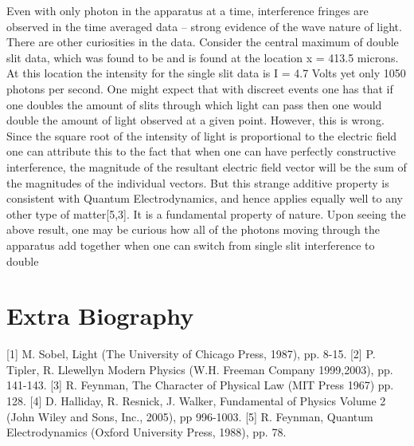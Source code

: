 \documentclass[12pt,twocolumn]{article}
\begin{document}
Even with only photon in the apparatus at a time, interference fringes are  observed in the time averaged data – strong evidence of the wave nature of light. There are other curiosities in the data. Consider the central maximum of double slit data, which was found to be and is found at the location x = 413.5 microns. At this location the intensity for the single slit data is I = 4.7 Volts yet only 1050 photons per second. One might expect that with discreet events one has that if one doubles the amount of slits through which light can pass then one would double the amount of light observed at a given point. However, this is wrong.  Since the square root of the intensity of light is proportional to the electric field one can attribute this to the fact that when one can have perfectly constructive interference, the magnitude of the resultant electric field vector will be the sum of the magnitudes of the individual vectors.  But this strange additive property is consistent with Quantum Electrodynamics, and hence applies equally well to any other type of matter[5,3]. It is a fundamental property of nature. Upon seeing the above result, one may be curious how all of the photons moving through the apparatus add together when one can switch from single slit interference to double


\nocite{*}


\section{Extra Biography}
[1] M. Sobel, Light (The University of Chicago Press, 1987), pp. 8-15.
[2] P. Tipler, R. Llewellyn Modern Physics (W.H. Freeman Company 1999,2003), pp. 141-143.
[3] R. Feynman, The Character of Physical Law (MIT Press 1967) pp. 128.
[4] D. Halliday, R. Resnick, J. Walker, Fundamental of Physics Volume 2 (John Wiley and Sons,
Inc., 2005), pp 996-1003.
[5] R. Feynman, Quantum Electrodynamics (Oxford University Press, 1988), pp. 78.
\end{document}
